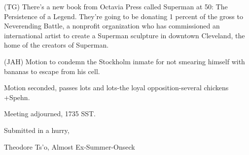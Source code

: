 \documentclass[12pt]{article}
\begin{document}
(TG) There's a new book from Octavia Press called Superman at 50: The Persistence of a Legend. They're going to be donating 1 percent of the gross to Neverending Battle, a nonprofit organization who has commissioned an international artist to create a Superman sculpture in downtown Cleveland, the home of the creators of Superman.

(JAH) Motion to condemn the Stockholm inmate for not smearing himself with bananas to escape from his cell.

Motion seconded, passes lots and lots-the loyal opposition-several chickens +Spehn.

\vspace{12pt}

\noindent
Meeting adjourned, 1735 SST.

\vspace{18pt}

\centerline{Submitted in a hurry,}
\centerline{Theodore Ts'o, Almost Ex-Summer-Onseck}
\end{document}
